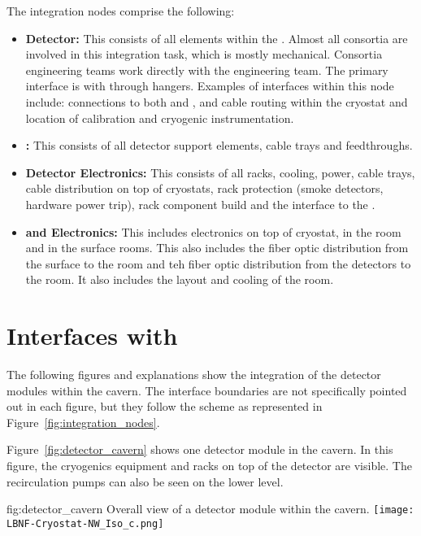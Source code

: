 The integration nodes comprise the following:
\begin{itemize}
\item {\bf Detector:} This consists of all  elements within
  the . Almost all consortia are involved in this
  integration task, which is mostly mechanical. Consortia engineering
  teams work directly with the  engineering team.  The
  primary interface is with  through hangers. Examples of
  interfaces within this node include:  connections to both
   and ,  and  cable
  routing within the cryostat and location of calibration and
  cryogenic instrumentation.
  \item {\bf {}:} This consists of all detector support elements,
  cable trays and feedthroughs.
\item {\bf Detector Electronics:} This consists of all racks, cooling, power, cable
  trays, cable distribution on top of cryostats, rack protection
  (smoke detectors, hardware power trip), rack component build and the interface to
  the .
\item {\bf {} and Electronics:} This includes electronics on top of cryostat,
  in the  room and in the surface rooms. This also includes the  fiber optic distribution from
  the surface to the  room and teh fiber optic distribution from the
  detectors to the  room. It also includes the layout and cooling of the 
  room.
\end{itemize}

\section{Interfaces with }
\label{sec:inter-lbnf-interf}
The following figures and explanations show the
integration of the detector modules within the cavern. The interface
boundaries are not specifically pointed out in each figure, but they
follow the scheme as represented in
Figure~\ref{fig:integration_nodes}.

Figure~\ref{fig:detector_cavern} shows one detector module in the
cavern. In this figure, the cryogenics equipment and racks on top of
the detector are visible. The  recirculation pumps can also be seen
on the lower level.
\begin{dunefigure}{fig:detector_cavern}
  {Overall view of a detector module within the cavern.}
  \texttt{[image: LBNF-Cryostat-NW\_Iso\_c.png]}
\end{dunefigure}

